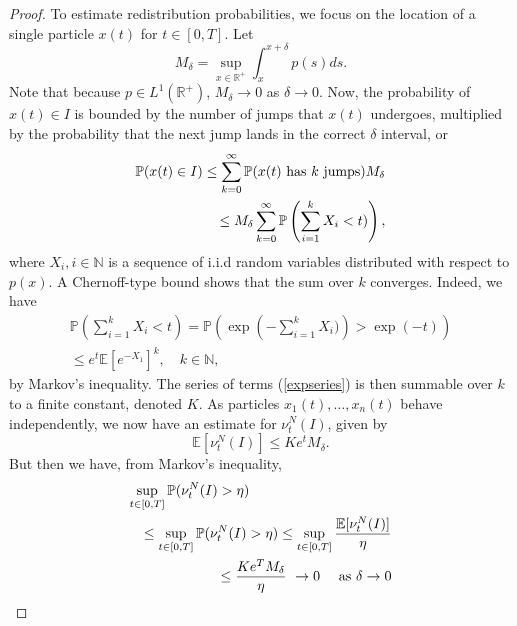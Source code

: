 \begin{proof}
To estimate redistribution probabilities, we focus on the location of a single particle $x(t)$ for $t \in [0,T].$ Let 
\begin{equation}
M_\delta = \sup_{x \in \mathbb R^+} \int_x^{x+\delta}p(s)ds.
\end{equation}
Note that because $p \in L^1(\mathbb{R}^+)$, $M_\delta \rightarrow 0$ as $\delta \rightarrow 0$. Now,  the probability of $x(t) \in I$ is bounded by the number of jumps that $x(t)$ undergoes, multiplied by the probability that the next jump lands in the correct $\delta$ interval, or
\begin{eqnarray}
\mathbb{P}(x(t) \in I) \le \sum_{k = 0}^\infty\mathbb{P}(x(t) \hbox{ has $k$ jumps})M_\delta\\
\le M_\delta\sum_{k = 0}^\infty \mathbb{P} \left(\sum_{i = 1}^k X_i <t)\right),\nonumber
\end{eqnarray}
where $X_i, i \in \mathbb N$ is a sequence of i.i.d random variables distributed with respect to $p(x)$.
A Chernoff-type bound shows that the sum over $k$ converges.  Indeed, we have
\begin{eqnarray}\label{chernoff}\mathbb{P} \left(\sum_{i = 1}^k X_i <t\right) =\mathbb{P} \left(\exp\left(-\sum_{i = 1}^k X_i) \right)>\exp(-t)\right)\\
\le e^{t}\mathbb{E}[e^{-X_1}]^k, \quad k \in \mathbb N,\label{expseries} \nonumber
\end{eqnarray}
by Markov's inequality. The series of  terms (\ref{expseries})  is then  summable over $k$ to a finite constant, denoted $K$.
As particles $x_1(t), \dots,x_n(t)$ behave independently, we now have an estimate for  $\nu_t^N(I)$, given by 
\begin{equation}
 \mathbb{E}[\nu_t^N(I)] \le Ke^tM_\delta. \nonumber
\end{equation}
But then we have, from Markov's inequality,
\begin{eqnarray}
\lefteqn{\sup_{t \in [0,T]}\mathbb{P}( \nu_t^N(I)>\eta)}\\ &&\le  \sup_{t \in [0,T]}\mathbb{P}( \nu_t^N(I)>\eta)  
 \le\sup_{t \in [0,T]}\frac{\mathbb{E}[ \nu_t^N(I)]}{\eta}\nonumber\\&&\le \frac{Ke^TM_\delta}{\eta}  \ \rightarrow 0\quad  \hbox{ as  } \delta \rightarrow 0 \nonumber
\end{eqnarray}
\end{proof}

